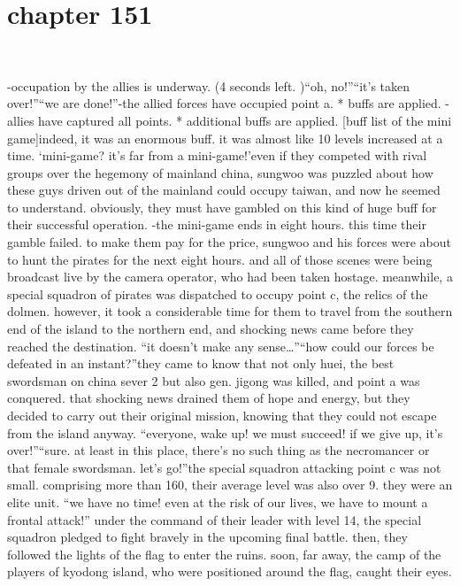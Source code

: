 \section{chapter 151}

                             




-occupation by the allies is underway.
 (4 seconds left.
)“oh, no!”“it’s taken over!”“we are done!”-the allied forces have occupied point a.
* buffs are applied.
-allies have captured all points.
* additional buffs are applied.
[buff list of the mini game]indeed, it was an enormous buff.
 it was almost like 10 levels increased at a time.
‘mini-game? it’s far from a mini-game!’even if they competed with rival groups over the hegemony of mainland china, sungwoo was puzzled about how these guys driven out of the mainland could occupy taiwan, and now he seemed to understand.
 obviously, they must have gambled on this kind of huge buff for their successful operation.
-the mini-game ends in eight hours.
this time their gamble failed.
 to make them pay for the price, sungwoo and his forces were about to hunt the pirates for the next eight hours.
and all of those scenes were being broadcast live by the camera operator, who had been taken hostage.
meanwhile, a special squadron of pirates was dispatched to occupy point c, the relics of the dolmen.
 however, it took a considerable time for them to travel from the southern end of the island to the northern end, and shocking news came before they reached the destination.
“it doesn’t make any sense…”“how could our forces be defeated in an instant?”they came to know that not only huei, the best swordsman on china sever 2 but also gen.
 jigong was killed, and point a was conquered.
that shocking news drained them of hope and energy, but they decided to carry out their original mission, knowing that they could not escape from the island anyway.
“everyone, wake up! we must succeed! if we give up, it’s over!”“sure.
 at least in this place, there’s no such thing as the necromancer or that female swordsman.
 let’s go!”the special squadron attacking point c was not small.
 comprising more than 160, their average level was also over 9.
 they were an elite unit.
“we have no time! even at the risk of our lives, we have to mount a frontal attack!”
under the command of their leader with level 14, the special squadron pledged to fight bravely in the upcoming final battle.
 then, they followed the lights of the flag to enter the ruins.
soon, far away, the camp of the players of kyodong island, who were positioned around the flag, caught their eyes.
